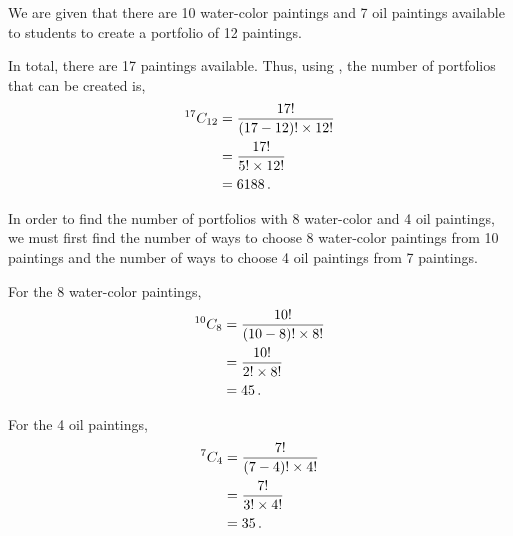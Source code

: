 %
%


\begin{subquestions}
	
\subquestion

We are given that there are 10 water-color paintings and 7 oil paintings available to students to create a portfolio of 12 paintings.	
	
\begin{subsubquestions}
	
\subsubquestion

In total, there are 17 paintings available. Thus, using , the number of portfolios that can be created is,
\begin{align}
	^{17}C_{12} & = \frac{17!}{(17-12)! \times 12!} \nonumber \\
	            & = \frac{17!}{5! \times 12!} \nonumber \\
	            & = 6188 \,.
\end{align}
	
	
\subsubquestion 

In order to find the number of portfolios with 8 water-color and 4 oil paintings, we must first find the number of ways to choose 8 water-color paintings from 10 paintings and the number of ways to choose 4 oil paintings from 7 paintings.

For the 8 water-color paintings,
\begin{align}
	^{10}C_{8} & = \frac{10!}{(10-8)! \times 8!} \nonumber \\
	           & = \frac{10!}{2! \times 8!} \nonumber \\
	           & = 45 \,.
\end{align}

For the 4 oil paintings,
\begin{align}
	^{7}C_{4} & = \frac{7!}{(7-4)! \times 4!} \nonumber \\
	          & = \frac{7!}{3! \times 4!} \nonumber \\
	          & = 35 \,.
\end{align}


\end{subsubquestions}
\end{subquestions}
